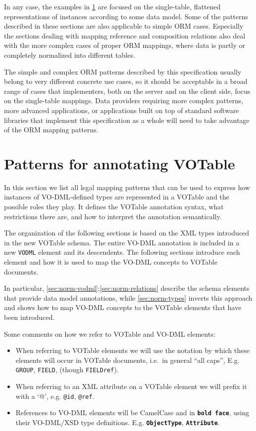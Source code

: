 \documentclass[11pt,a4paper]{ivoa}
\begin{document}
In any case, the examples in \ref{sec:normative} are focused on the
single-table, flattened representations of instances according to some
data model. Some of the patterns described in these sections are also
applicable to simple ORM cases. Especially the sections dealing with
mapping reference and composition relations also deal with the more
complex cases of proper ORM mappings, where data is partly or completely
normalized into different tables.

The simple and complex ORM patterns described by this specification
usually belong to very different concrete use cases, so it should be
acceptable in a broad range of cases that implementers, both on the
server and on the client side, focus on the single-table mappings. Data
providers requiring more complex patterns, more advanced applications,
or applications built on top of standard software libraries that
implement this specification as a whole will need to take advantage of
the ORM mapping patterns.

\section{Patterns for annotating VOTable}\label{sec:normative}

In this section we list all legal mapping patterns that can be used to
express how instances of VO-DML-defined types are represented in a
VOTable and the possible roles they play. It defines the VOTable
annotation syntax, what restrictions there are, and how to interpret the
annotation semantically.

The organization of the following sections is based on the XML types
introduced in the new VOTable schema. The entire VO-DML annotation is
included in a new \texttt{VODML} element and its descendents. The
following sections introduce each element and how it is used to map the
VO-DML concepts to VOTable documents.

In particular, \ref{sec:norm-vodml};\ref{sec:norm-relations} describe the
schema elements that provide data model annotations, while
\ref{sec:norm-types} inverts this approach and shows how to map VO-DML
concepts to the VOTable elements that have been introduced.

Some comments on how we refer to VOTable and VO-DML elements:

\begin{itemize}
\item
  When referring to VOTable elements we will use the notation by which
  these elements will occur in VOTable documents, i.e.~in general ``all
  caps'', E.g. \texttt{GROUP}, \texttt{FIELD}, (though
  \texttt{FIELDref}).
\item
  When referring to an XML attribute on a VOTable element we will prefix
  it with a `@', e.g. \texttt{@id}, \texttt{@ref}.
\item
  References to VO-DML elements will be CamelCase and in
  \textbf{\texttt{bold face}}, using their VO-DML/XSD type definitions.
  E.g. \textbf{\texttt{ObjectType}}, \textbf{\texttt{Attribute}}.
\end{itemize}
\end{document}
